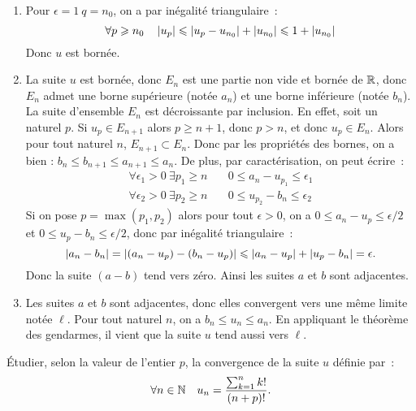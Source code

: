         \begin{enumerate}
          \item Pour \(\epsilon = 1 \ q = n_0\), on a par inégalité 
            triangulaire~:
            \[ \forall p \geqslant n_0 \quad \left\lvert u_p\right\rvert \leqslant \left\lvert u_p - 
            u_{n_0}\right\rvert + \left\lvert u_{n_0}\right\rvert \leqslant 1 + \left\lvert u_{n_0}\right\rvert\]
            Donc \(u\) est bornée.
          \item La suite \(u\) est bornée, donc \(E_n\) est une partie non vide 
            et bornée de \(\mathbb{R}\), donc \(E_n\) admet une borne supérieure (notée 
            \(a_n\)) et une borne inférieure (notée \(b_n\)). La suite 
            d'ensemble \(E_n\) est décroissante par inclusion. En effet, soit un 
            naturel \(p\). Si \(u_p \in E_{n+1}\) alors \(p \geqslant n+1\), 
            donc \(p > n\), et donc \(u_p \in E_n\). Alors pour tout naturel 
            \(n\), \(E_{n+1} \subset E_n\). Donc par les propriétés des bornes, 
            on a bien : \(b_n \leqslant b_{n+1} \leqslant a_{n+1} \leqslant 
            a_n\). De plus, par caractérisation, on peut écrire~:
            \begin{align*}
              \forall \epsilon_1 >0 \ \exists p_1 \geqslant n & \quad 0 
              \leqslant a_n - u_{p_1} \leqslant \epsilon_1 \\
              \forall \epsilon_2 >0 \ \exists p_2 \geqslant n & \quad 0 
              \leqslant u_{p_2} - b_n \leqslant \epsilon_2
            \end{align*}
            Si on pose \(p = \max(p_1,p_2)\) alors pour tout \(\epsilon>0\), on 
            a \(0 \leqslant a_n-u_p \leqslant \epsilon/2\) et \(0 \leqslant 
            u_p-b_n \leqslant \epsilon/2\), donc par inégalité triangulaire~:
            \[ \left\lvert a_n - b_n\right\rvert = \left\lvert(a_n-u_p) - (b_n-u_p)\right\rvert \leqslant 
            \left\lvert a_n-u_p\right\rvert + \left\lvert u_p-b_n\right\rvert = \epsilon. \]
            Donc la suite \((a-b)\) tend vers zéro. Ainsi les suites \(a\) et 
            \(b\) sont adjacentes.
          \item Les suites \(a\) et \(b\) sont adjacentes, donc elles convergent 
            vers une même limite notée \(\ell\). Pour tout naturel \(n\), on a 
            \(b_n \leqslant u_n \leqslant a_n\). En appliquant le théorème des 
            gendarmes, il vient que la suite \(u\) tend aussi vers \(\ell\).
        \end{enumerate}
        \begin{exercice}
          Étudier, selon la valeur de l'entier \(p\), la convergence de la suite 
          \(u\) définie par~: \[\forall n \in \mathbb{N} \quad u_n = \frac{\sum_{k = 
          1}^n k!}{(n+p)!}.\]
        \end{exercice}

